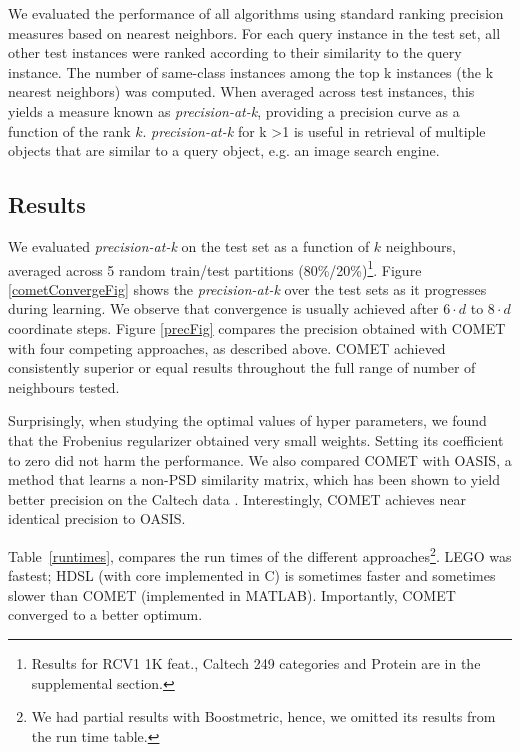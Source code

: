 \documentclass{article} %
\newcommand{\tabref}[1]{Table~\ref{#1}}
\begin{document}
We evaluated the performance of all algorithms using standard ranking precision measures based on nearest neighbors. For each query instance in the test set, all other test instances were ranked according to their similarity to the query instance. The number of same-class instances
among the top k instances (the k nearest neighbors) was computed. When averaged across test
instances, this yields a measure known as \textit{precision-at-k},
providing a precision curve as a function of the rank $k$. \textit{precision-at-k} for k >1 is useful in retrieval of multiple objects that are similar to a query object, e.g. an image search engine.

\subsection{Results}
We evaluated \textit{precision-at-k} on the test set as a function of $k$ neighbours, averaged across 5 random train/test partitions (80\%/20\%)\footnote{Results for RCV1 1K feat., Caltech 249 categories and Protein are in the supplemental section.}.
Figure \ref{cometConvergeFig} shows the \textit{precision-at-k} over the test sets as it progresses during learning. We observe that convergence is usually achieved after $6 \cdot d$ to $8 \cdot d$ coordinate steps.
Figure \ref{precFig} compares the precision obtained with COMET with four competing approaches, as described above. COMET achieved consistently superior or equal results throughout the full range of number of neighbours tested. 

Surprisingly, when studying the optimal values of hyper parameters, we found that the Frobenius regularizer obtained very small weights. Setting its coefficient to zero did not harm the performance. We also compared COMET with OASIS, a method that learns a non-PSD similarity matrix, which has been shown to yield better precision on the Caltech data \cite{OASIS}. Interestingly, COMET achieves near identical precision to OASIS. 

\tabref{runtimes}, compares the run times of the different approaches\footnote{We had partial results with Boostmetric, hence, we omitted its results from the run time table.}. LEGO was fastest; HDSL (with core implemented in C) is sometimes faster and sometimes slower than COMET (implemented in MATLAB). Importantly, COMET converged to a better optimum.
\end{document}
